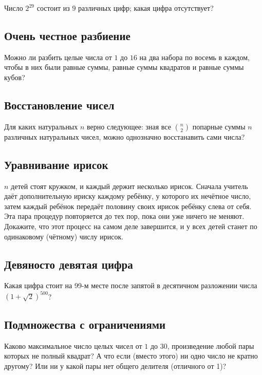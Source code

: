 Число $2^{29}$ состоит из $9$ различных цифр; какая цифра отсутствует?

\subsection*{Очень честное разбиение}

Можно ли разбить целые числа от $1$ до $16$ на два набора по восемь в каждом,
чтобы в них были равные суммы, равные суммы квадратов и равные суммы кубов?

\subsection*{Восстановление чисел}

Для каких натуральных $n$ верно следующее: зная все $\binom n2$ попарные суммы $n$ различных натуральных чисел, можно однозначно восстанавить сами числа?


\subsection*{Уравнивание ирисок}

$n$ детей стоят кружком, и каждый держит несколько ирисок.
Сначала учитель даёт дополнительную ириску каждому ребёнку, у которого их нечётное число,
затем каждый ребёнок передаёт половину своих ирисок ребёнку слева от себя.
Эта пара процедур повторяется до тех пор, пока они уже ничего не меняют.
Докажите, что этот процесс на самом деле завершится, и у всех детей станет по одинаковому (чётному) числу ирисок.

\subsection*{Девяносто девятая цифра}

Какая цифра стоит на 99-м месте после запятой в десятичном разложении числа 
$(1+\sqrt2)^{500}$?

\subsection*{Подмножества с ограничениями}

Каково максимальное число целых чисел от $1$ до $30$, произведение любой пары которых не полный квадрат?
А что если (вместо этого) ни одно число не кратно другому?
Или ни у какой пары нет общего делителя (отличного от 1)?

